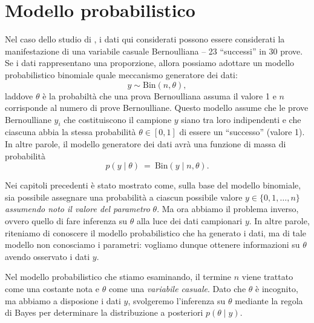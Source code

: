 \documentclass[
  10pt,
  italian,
  a4paper,
  extrafontsizes,onecolumn,openright
  ]{memoir}
\theoremstyle{definition}
\theoremstyle{definition}
\theoremstyle{definition}
\theoremstyle{definition}
\theoremstyle{remark}
\begin{document}
\hypertarget{modello-probabilistico}{%
\section{Modello probabilistico}\label{modello-probabilistico}}

Nel caso dello studio di \textcite{zetschefuture2019}, i dati qui considerati possono essere considerati la manifestazione di una variabile casuale Bernoulliana -- 23 ``successi'' in 30 prove. Se i dati rappresentano una proporzione, allora possiamo adottare un modello probabilistico binomiale quale meccanismo generatore dei dati:
\begin{equation}
y  \sim \mbox{Bin}(n, \theta),
\label{eq:binomialmodel}
\end{equation}
laddove \(\theta\) è la probabiltà che una prova Bernoulliana assuma il valore 1 e \(n\) corrisponde al numero di prove Bernoulliane. Questo modello assume che le prove Bernoulliane \(y_i\) che costituiscono il campione \(y\) siano tra loro indipendenti e che ciascuna abbia la stessa probabilità \(\theta \in [0, 1]\) di essere un ``successo'' (valore 1). In altre parole, il modello generatore dei dati avrà una funzione di massa di probabilità
\[
p(y \mid \theta)
\ = \
\mbox{Bin}(y \mid n, \theta).
\]

Nei capitoli precedenti è stato mostrato come, sulla base del modello binomiale, sia possibile assegnare una probabilità a ciascun possibile valore \(y \in \{0, 1, \dots, n\}\) \emph{assumendo noto il valore del parametro} \(\theta\). Ma ora abbiamo il problema inverso, ovvero quello di fare inferenza su \(\theta\) alla luce dei dati campionari \(y\). In altre parole, riteniamo di conoscere il modello probabilistico che ha generato i dati, ma di tale modello non conosciamo i parametri: vogliamo dunque ottenere informazioni su \(\theta\) avendo osservato i dati \(y\).

Nel modello probabilistico che stiamo esaminando, il termine \(n\) viene trattato come una costante nota e \(\theta\) come una \emph{variabile casuale}.
Dato che \(\theta\) è incognito, ma abbiamo a disposione i dati \(y\), svolgeremo l'inferenza su \(\theta\) mediante la regola di Bayes per determinare la distribuzione a posteriori \(p(\theta \mid y)\).
\end{document}
